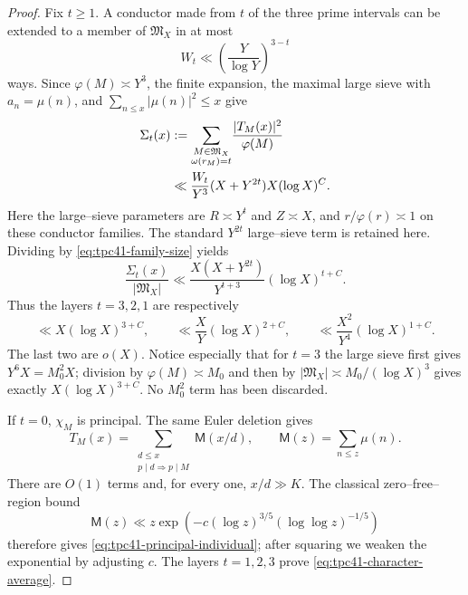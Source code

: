\begin{proof}
Fix \(t\ge1\).  A conductor made from \(t\) of the three prime intervals
can be extended to a member of \(\mathfrak M_X\) in at most
\begin{equation}
 W_t\ll\left(\frac{Y}{\log Y}\right)^{3-t}
 \label{eq:tpc41-extension-count}
\end{equation}
ways.  Since \(\varphi(M)\asymp Y^3\), the finite expansion, the maximal
large sieve with \(a_n=\mu(n)\), and
\(\sum_{n\le x}|\mu(n)|^2\le x\) give
\begin{align}
 \Sigma_t(x)
 &:={\sum_{\substack{M\in\mathfrak M_X\\
       \omega(r_M)=t}}}
   \frac{|T_M(x)|^2}{\varphi(M)}
 \notag\\
 &\ll
 \frac{W_t}{Y^3}
 (X+Y^{2t})X(\log X)^C.
 \label{eq:tpc41-Sigma-t}
\end{align}
Here the large--sieve parameters are \(R\asymp Y^t\) and \(Z\asymp X\),
and \(r/\varphi(r)\asymp1\) on these conductor families.  The standard
\(Y^{2t}\) large--sieve term is retained here.
Dividing by \eqref{eq:tpc41-family-size} yields
\begin{equation}
 \frac{\Sigma_t(x)}{|\mathfrak M_X|}
 \ll
 \frac{X(X+Y^{2t})}{Y^{t+3}}(\log X)^{t+C}.
 \label{eq:tpc41-Sigma-average}
\end{equation}
Thus the layers \(t=3,2,1\) are respectively
\begin{equation}
 \ll X(\log X)^{3+C},
 \qquad
 \ll\frac XY(\log X)^{2+C},
 \qquad
 \ll\frac{X^2}{Y^4}(\log X)^{1+C}.
 \label{eq:tpc41-layer-table}
\end{equation}
The last two are \(o(X)\).  Notice especially that for \(t=3\) the
large sieve first gives \(Y^6X=M_0^2X\); division by
\(\varphi(M)\asymp M_0\) and then by
\(|\mathfrak M_X|\asymp M_0/(\log X)^3\) gives exactly
\(X(\log X)^{3+C}\).  No \(M_0^2\) term has been discarded.

If \(t=0\), \(\chi_M\) is principal.  The same Euler deletion gives
\begin{equation}
 T_M(x)=
 \sum_{\substack{d\le x\\p\mid d\Rightarrow p\mid M}}
 \mathsf M(x/d),
 \qquad
 \mathsf M(z)=\sum_{n\le z}\mu(n).
 \label{eq:tpc41-principal-Mertens}
\end{equation}
There are \(O(1)\) terms and, for every one, \(x/d\gg K\).  The classical
zero--free--region bound \citep[Chapter~5]{IwaniecKowalski2004}
\begin{equation}
 \mathsf M(z)
 \ll z\exp\left(
  -c(\log z)^{3/5}(\log\log z)^{-1/5}
 \right)
 \label{eq:tpc41-Mertens-bound}
\end{equation}
therefore gives \eqref{eq:tpc41-principal-individual}; after squaring we
weaken the exponential by adjusting \(c\).  The layers \(t=1,2,3\) prove
\eqref{eq:tpc41-character-average}.
\end{proof}

